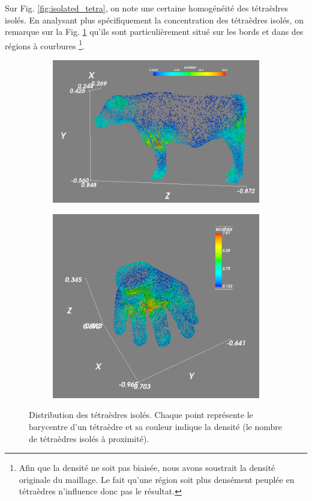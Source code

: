 \noindent
Sur Fig. \ref{fig:isolated_tetra}, on note une certaine homogénéité des tétraèdres isolés. En analysant plus spécifiquement la concentration des tétraèdres isolés, on remarque sur la Fig. \ref{fig:density_cow_hand} qu'ils sont particulièrement situé sur les bords et dans des régions à courbures \footnote{Afin que la densité ne soit pas biaisée, nous avons soustrait la densité originale du maillage. Le fait qu'une région soit plus densément peuplée en tétraèdres n'influence donc pas le résultat.}.
\begin{figure}[H]
\centering
\begin{subfigure}{.5\textwidth}
  \centering
  \includegraphics[scale=0.25]{Images/density_cow}
\end{subfigure}%
\begin{subfigure}{.5\textwidth}
  \centering
  \includegraphics[scale=0.22]{Images/hand_density}
\end{subfigure}
\caption{Distribution des tétraèdres isolés. Chaque point représente le barycentre d'un tétraèdre et sa couleur indique la densité (le nombre de tétraèdres isolés à proximité).}
\label{fig:density_cow_hand}
\end{figure}

